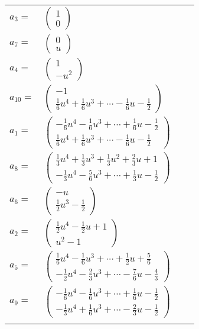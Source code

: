 \documentclass[1p]{elsarticle_modified}
\theoremstyle{definition}
\begin{document}
\begin{tabular}{m{7pt} m{180pt} m{7pt} m{180pt} }
\flushright $a_{3}=$&$\begin{pmatrix}1\\0\end{pmatrix}$ \\
\flushright $a_{7}=$&$\begin{pmatrix}0\\u\end{pmatrix}$ \\
\flushright $a_{4}=$&$\begin{pmatrix}1\\- u^2\end{pmatrix}$ \\
\flushright $a_{10}=$&$\begin{pmatrix}-1\\\frac{1}{6} u^4+\frac{1}{6} u^3+\cdots-\frac{1}{6} u-\frac{1}{2}\end{pmatrix}$ \\
\flushright $a_{1}=$&$\begin{pmatrix}-\frac{1}{6} u^4-\frac{1}{6} u^3+\cdots+\frac{1}{6} u-\frac{1}{2}\\\frac{1}{6} u^4+\frac{1}{6} u^3+\cdots-\frac{1}{6} u-\frac{1}{2}\end{pmatrix}$ \\
\flushright $a_{8}=$&$\begin{pmatrix}\frac{1}{3} u^4+\frac{1}{3} u^3+\frac{1}{3} u^2+\frac{2}{3} u+1\\-\frac{1}{3} u^4-\frac{5}{6} u^3+\cdots+\frac{1}{3} u-\frac{1}{2}\end{pmatrix}$ \\
\flushright $a_{6}=$&$\begin{pmatrix}- u\\\frac{1}{2} u^3-\frac{1}{2}\end{pmatrix}$ \\
\flushright $a_{2}=$&$\begin{pmatrix}\frac{1}{2} u^4-\frac{1}{2} u+1\\u^2-1\end{pmatrix}$ \\
\flushright $a_{5}=$&$\begin{pmatrix}\frac{1}{6} u^4-\frac{1}{6} u^3+\cdots+\frac{1}{2} u+\frac{5}{6}\\-\frac{1}{2} u^4-\frac{2}{3} u^3+\cdots-\frac{7}{6} u-\frac{4}{3}\end{pmatrix}$ \\
\flushright $a_{9}=$&$\begin{pmatrix}-\frac{1}{6} u^4-\frac{1}{6} u^3+\cdots+\frac{1}{6} u-\frac{1}{2}\\-\frac{1}{3} u^4+\frac{1}{6} u^3+\cdots-\frac{2}{3} u-\frac{1}{2}\end{pmatrix}$\\&\end{tabular}
\end{document}
